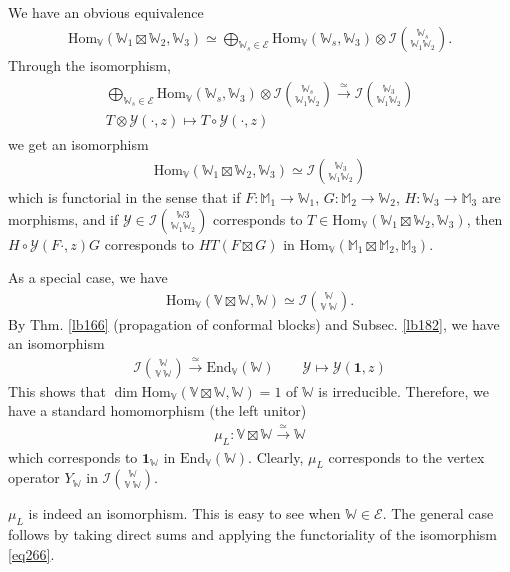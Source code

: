 \documentclass[12pt,a4paper,notitlepage]{article}
\theoremstyle{definition}
\theoremstyle{plain}
\newcommand{\mc}{\mathcal}
\newcommand{\End}{\mathrm{End}} %
\newcommand{\id}{\mathbf{1}}
\newcommand{\Hom}{\mathrm{Hom}}
\newcommand{\Vbb}{\mathbb V}
\newcommand{\Wbb}{\mathbb W}
\newcommand{\Mbb}{\mathbb M}
\numberwithin{equation}{section}
\begin{document}
We have an obvious equivalence
\begin{align*}
\Hom_\Vbb(\Wbb_1\boxtimes\Wbb_2,\Wbb_3)\simeq \bigoplus_{\Wbb_s\in\mc E}\Hom_\Vbb(\Wbb_s,\Wbb_3)\otimes \mc I{\Wbb_s\choose \Wbb_1\Wbb_2}.
\end{align*}
Through the isomorphism,
\begin{gather}
\begin{gathered}
\bigoplus_{\Wbb_s\in\mc E}\Hom_\Vbb(\Wbb_s,\Wbb_3)\otimes \mc I{\Wbb_s\choose \Wbb_1\Wbb_2}\xrightarrow{\simeq} \mc I{\Wbb_3\choose \Wbb_1\Wbb_2}\\
T\otimes\mc Y(\cdot,z)\mapsto T\circ\mc Y(\cdot,z) 
\end{gathered}
\end{gather}
we get an isomorphism
\begin{align}
\Hom_\Vbb(\Wbb_1\boxtimes\Wbb_2,\Wbb_3)\simeq\mc I{\Wbb_3\choose \Wbb_1\Wbb_2}\label{eq266}
\end{align}
which is functorial in the sense that if $F:\Mbb_1\rightarrow\Wbb_1$, $G:\Mbb_2\rightarrow\Wbb_2$, $H:\Wbb_3\rightarrow\Mbb_3$ are morphisms, and if $\mc Y\in\mc I{\Wbb3\choose \Wbb_1\Wbb_2}$ corresponds to $T\in\Hom_\Vbb(\Wbb_1\boxtimes\Wbb_2,\Wbb_3)$, then $H\circ\mc Y(F\cdot,z)G$ corresponds to $HT(F\boxtimes G)$ in $\Hom_\Vbb(\Mbb_1\boxtimes\Mbb_2,\Mbb_3)$.

As a special case, we have
\begin{align}
\Hom_\Vbb(\Vbb\boxtimes\Wbb,\Wbb)\simeq\mc I{\Wbb\choose\Vbb~\Wbb}.
\end{align}
By Thm. \ref{lb166} (propagation of conformal blocks) and Subsec. \ref{lb182}, we have an isomorphism
\begin{gather*}
\mc I{\Wbb\choose\Vbb~\Wbb}\xrightarrow{\simeq}\End_\Vbb(\Wbb)\qquad\mc Y\mapsto \mc Y(\id,z)
\end{gather*}
This shows that $\dim\Hom_\Vbb(\Vbb\boxtimes\Wbb,\Wbb)=1$ of $\Wbb$ is irreducible. Therefore, we have a standard homomorphism (the left unitor)
\begin{align}
\mu_L:\Vbb\boxtimes\Wbb\xrightarrow{\simeq}\Wbb
\end{align}
which corresponds to $\id_\Wbb$ in $\End_\Vbb(\Wbb)$. Clearly, $\mu_L$ corresponds to the vertex operator $Y_\Wbb$ in $\mc I{\Wbb\choose\Vbb~\Wbb}$.

$\mu_L$ is indeed an isomorphism. This is easy to see when $\Wbb\in\mc E$. The general case follows by taking direct sums and applying the functoriality of the isomorphism \eqref{eq266}.
\end{document}
